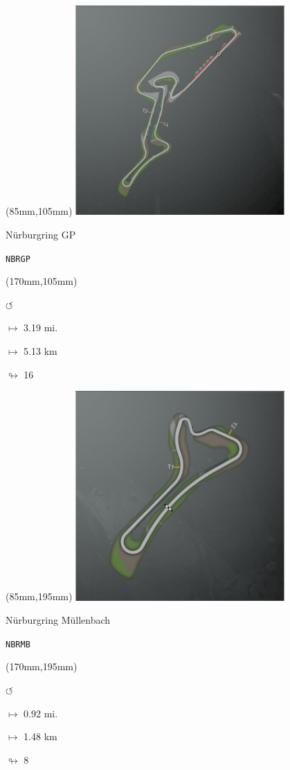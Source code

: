\begin{textblock*}{80mm}(85mm,105mm)%
\includegraphics[width=80mm]{TR/2015-05-20_00041.png}
\centerline{Nürburgring GP}
\par\hfill\tiny\tt NBRGP\\
\end{textblock*}
\begin{textblock*}{30mm}(170mm,105mm)%
\par \Huge$\circlearrowleft$
\Large
\par$\mapsto$ 3.19 mi.
\par$\mapsto$ 5.13 km
\par$\looparrowright$ 16
\end{textblock*}
\begin{textblock*}{80mm}(85mm,195mm)%
\includegraphics[width=80mm]{TR/2015-05-20_00042.png}
\centerline{Nürburgring Müllenbach}
\par\hfill\tiny\tt NBRMB\\
\end{textblock*}
\begin{textblock*}{30mm}(170mm,195mm)%
\par \Huge$\circlearrowleft$
\Large
\par$\mapsto$ 0.92 mi.
\par$\mapsto$ 1.48 km
\par$\looparrowright$ 8
\end{textblock*}
\null\newpage

